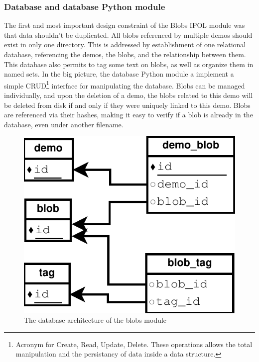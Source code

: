 \subsubsection{Database and database Python module}
The first and most important design constraint of the Blobs IPOL module was that data shouldn't be duplicated. All blobs referenced by multiple demos should exist in only one directory. This is addressed by establishment of one relational database, referencing the demos, the blobs, and the relationship between them. This database also permits to tag some text on blobs, as well as organize them in named sets. In the big picture, the database Python module a implement a simple CRUD\footnote{Acronym for Create, Read, Update, Delete. These operations allows the total manipulation and the persistancy of data inside a data structure.} interface for manipulating the database. Blobs can be managed individually, and upon the deletion of a demo, the blobs related to this demo will be deleted from disk if and only if they were uniquely linked to this demo. Blobs are referenced via their hashes, making it easy to verify if a blob is already in the database, even under another filename. \\

\begin{figure}[h]
\centering
\includegraphics[scale=0.75]{resources/blobs/blobs_database.pdf}
\caption{The database architecture of the blobs module} 
\label{fig:blobs_database}
\end{figure}


